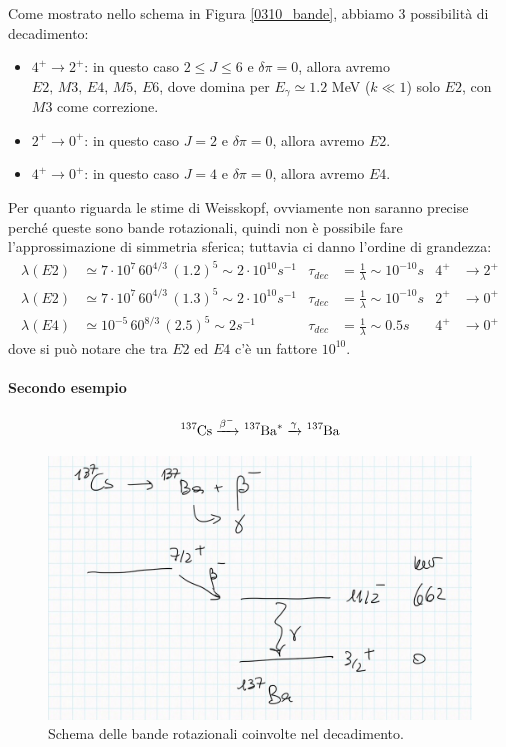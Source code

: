 Come mostrato nello schema in Figura \ref{0310_bande}, abbiamo 3 possibilità di decadimento:
\begin{itemize}
    \item $4^+\to2^+$: in questo caso $2\leq J\leq 6$ e $\delta \pi = 0$, allora avremo $E2,\,M3,\,E4,\,M5,\,E6$, dove domina per $E_\gamma\simeq 1.2$ MeV ($k\ll 1$) solo $E2$, con $M3$ come correzione.
    \item $2^+\to0^+$: in questo caso $J=2$ e $\delta \pi = 0$, allora avremo $E2$.
    \item $4^+\to0^+$: in questo caso $J=4$ e $\delta \pi = 0$, allora avremo $E4$.
\end{itemize}
Per quanto riguarda le stime di Weisskopf, ovviamente non saranno precise perché queste sono bande rotazionali, quindi non è possibile fare l'approssimazione di simmetria sferica; tuttavia ci danno l'ordine di grandezza:
\begin{displaymath}
\begin{aligned}
\lambda(E2) &\simeq 7\cdot 10^7 \, 60^{4/3}\, (1.2)^5 \sim 2\cdot 10^{10} \unit{s}^{-1} & \tau_{dec} &= \frac{1}{\lambda} \sim 10^{-10} \unit{s} & 4^+&\to2^+ \\
%
\lambda(E2) &\simeq 7\cdot 10^7 \, 60^{4/3}\, (1.3)^5 \sim 2\cdot 10^{10} \unit{s}^{-1} & \tau_{dec} &= \frac{1}{\lambda} \sim 10^{-10} \unit{s} & 2^+&\to0^+ \\
%
\lambda(E4) &\simeq 10^{-5} \, 60^{8/3}\, (2.5)^5 \sim 2 \unit{s}^{-1} & \tau_{dec} &= \frac{1}{\lambda} \sim 0.5 \unit{s} & 4^+&\to0^+ 
\end{aligned}
\end{displaymath}
dove si può notare che tra $E2$ ed $E4$ c'è un fattore $10^{10}$. 

\paragraph{Secondo esempio}
$$\ce{^{137}Cs}  \xrightarrow{\beta^-} \ce{^{137}Ba}^*  \xrightarrow{\gamma}  \ce{^{137}Ba}$$

\begin{figure}[h]
    \centering
    \includegraphics[scale=0.2]{Immagini/0310_bande2.png}
    \caption{Schema delle bande rotazionali coinvolte nel decadimento.}
    \label{0310_bande1}
\end{figure}

